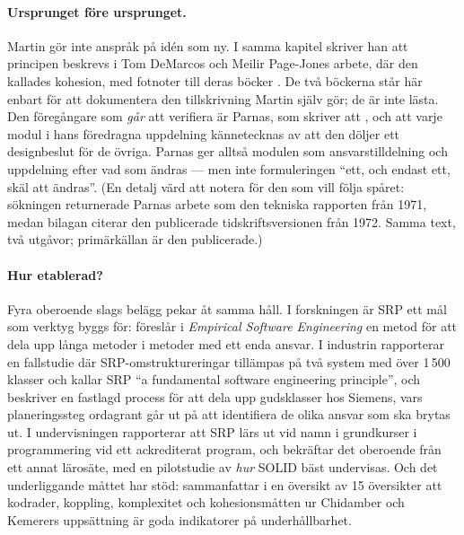 \paragraph{Ursprunget före ursprunget.}  Martin gör inte anspråk på idén
som ny.  I samma kapitel skriver han att principen beskrevs i Tom DeMarcos
och Meilir Page-Jones arbete, där den kallades
kohesion\autocite[ch.~8]{Martin2003Agile}, med fotnoter till deras böcker
\autocite{DeMarco1979Structured,PageJones1988Practical}.  De två böckerna
står här enbart för att dokumentera den tillskrivning Martin själv gör;
de är inte lästa.  Den föregångare som \emph{går} att verifiera är Parnas,
som skriver att , och att varje modul i hans föredragna uppdelning
kännetecknas av att den döljer ett designbeslut för de
övriga\autocite[s.~1056]{Parnas1972Criteria}.  Parnas ger alltså modulen
som ansvarstilldelning och uppdelning efter vad som ändras --- men inte
formuleringen \enquote{ett, och endast ett, skäl att ändras}.  (En
detalj värd att notera för den som vill följa spåret: sökningen
returnerade Parnas arbete som den tekniska rapporten från 1971, medan
bilagan citerar den publicerade tidskriftsversionen från 1972.  Samma
text, två utgåvor; primärkällan är den publicerade.)

\paragraph{Hur etablerad?}  Fyra oberoende slags belägg pekar åt samma
håll.  I forskningen är SRP ett mål som verktyg byggs för:
\textcite{Ardalani2024Supporting} föreslår i \emph{Empirical Software
Engineering} en metod för att dela upp långa metoder i metoder med ett
enda ansvar.  I industrin rapporterar
\textcite{Ampatzoglou2019Applying} en fallstudie där SRP-omstruktureringar
tillämpas på två system med över 1\,500 klasser och kallar SRP
\enquote{a fundamental software engineering principle}, och
\textcite{Anquetil2019Decomposing} beskriver en fastlagd process för att
dela upp gudsklasser hos Siemens, vars planeringssteg ordagrant går ut på
att identifiera de olika ansvar som ska brytas ut.  I undervisningen
rapporterar \textcite{Cabezas2020Using} att SRP lärs ut vid namn i
grundkurser i programmering vid ett ackrediterat program, och
\textcite{Gopal2024Teaching} bekräftar det oberoende från ett annat
lärosäte, med en pilotstudie av \emph{hur} SOLID bäst undervisas.  Och
det underliggande måttet har stöd: \textcite{Iftikhar2024Tertiary}
sammanfattar i en översikt av 15 översikter att kodrader, koppling,
komplexitet och kohesionsmåtten ur Chidamber och Kemerers uppsättning är
goda indikatorer på underhållbarhet.

